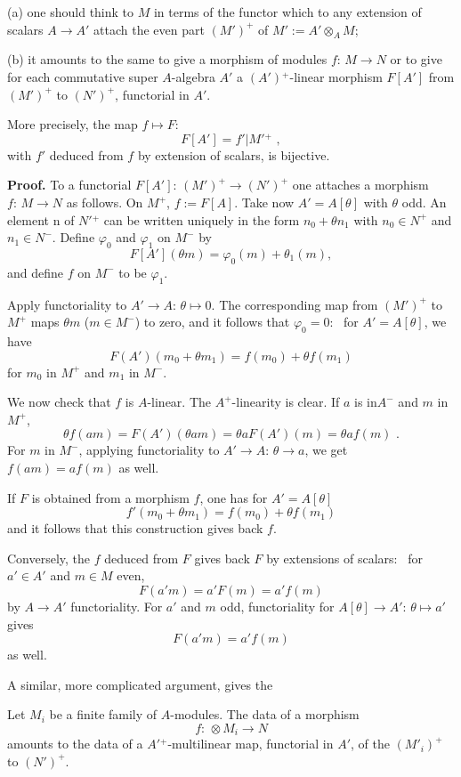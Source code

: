 \medskip\noindent
(a)\enspace
one should think to $M$ in terms of the functor which to
any extension of scalars $A\to A'$ attach the even part
$(M')^{\plus}$ of $M':= A'\otimes_A M$;

\smallskip\noindent
(b)\enspace
it amounts to the same to give a morphism of modules
$f\colon\,M\to N$ or to give for each commutative super
$A$-algebra $A'$ a $(A'){^{\plus}}$-linear morphism
$F[A']$ from $(M')^{\plus}$ to $(N')^{\plus}$,
functorial in $A'$.

More precisely, the map $f\mapsto F$:
$$
F[A']=f'\vert M'{^{\plus}}\,\,,
$$
with $f'$ deduced from $f$ by extension of scalars, is
bijective.

\medskip\noindent
{\bf Proof.}\enspace
To a functorial $F[A']\colon\, (M')^{\plus}\to
(N')^{\plus}$ one attaches a morphism $f\colon\, M\to N$
as follows.
On $M^{\plus}$, $f:=F[A]$.
Take now $A'=A[\theta]$ with $\theta$ odd.
An element n of $N'{^{\plus}}$ can be written uniquely in
the form $n_0+\theta n_1$ with $n_0\in N^{\plus}$ and
$n_1\in N^-$.
Define $\varphi_0$ and $\varphi_1$ on $M^-$ by
$$
F[A'](\theta m)=\varphi_0(m)+\theta_1(m),
$$
and define $f$ on $M^-$ to be $\varphi_1$.

Apply functoriality to $A'\to A\colon\, \theta\mapsto 0$.
The corresponding map from $(M')^{\plus}$ to $M^{\plus}$
maps $\theta m$ ($m\in M^-$) to zero, and it follows
that $\varphi_0=0$: \ for $A'=A[\theta]$, we have
$$
F(A')(m_0+\theta m_1)=f(m_0)+\theta f(m_1)
$$
for $m_0$ in $M^{\plus}$ and $m_1$ in $M^-$.

We now check that $f$ is $A$-linear.
The $A^{\plus}$-linearity is clear.
If $a$ is in$A^-$ and $m$ in $M^{\plus}$,
$$
\theta f(am)=F(A')(\theta am)=\theta a F(A')(m)=
\theta af(m)\,\,.
$$
For $m$ in $M^-$, applying functoriality to $A'\to
A\colon\, \theta\to a$, we get $f(am)=af(m)$ as well.

If $F$ is obtained from a morphism $f$, one has for
$A'=A[\theta]$
$$
f'(m_0+\theta m_1)=f(m_0)+\theta f(m_1)
$$
and it follows that this construction gives back $f$.

Conversely, the $f$ deduced from $F$ gives back $F$ by
extensions of scalars: \ for $a'\in A'$ and $m\in M$
even,
$$
F(a'm)=a'F(m)=a'f(m)
$$
by $A\to A'$ functoriality.
For $a'$ and $m$ odd, functoriality for $A[\theta]\to
A'\colon\,\theta\mapsto a'$ gives
$$
F(a'm)=a'f(m)
$$
as well.

A similar, more complicated argument, gives the

Let $M_i$ be a finite family of $A$-modules.
The data of a morphism
$$
f\colon\,\otimes M_i\to N
$$
amounts to the data of a 
$A'{^{\plus}}$-multilinear map, functorial in
$A'$, of the $(M'_i)^{\plus}$ to $(N')^{\plus}$.
\endproclaim

